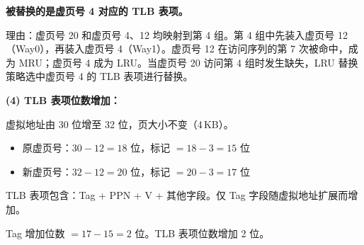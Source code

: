 \documentclass[12pt,a4paper]{ctexart}
\begin{document}
\begin{enumerate}[leftmargin=*,resume]
\textbf{被替换的是虚页号 4 对应的 TLB 表项。}

理由：虚页号 20 和虚页号 4、12 均映射到第 4 组。第 4 组中先装入虚页号 12（Way0），再装入虚页号 4（Way1）。虚页号 12 在访问序列的第 7 次被命中，成为 MRU；虚页号 4 成为 LRU。当虚页号 20 访问第 4 组时发生缺失，LRU 替换策略选中虚页号 4 的 TLB 表项进行替换。

\textbf{(4) TLB 表项位数增加：}

虚拟地址由 30 位增至 32 位，页大小不变（4\,KB）。
\begin{itemize}
\item 原虚页号：$30 - 12 = 18$ 位，标记 $= 18 - 3 = 15$ 位
\item 新虚页号：$32 - 12 = 20$ 位，标记 $= 20 - 3 = 17$ 位
\end{itemize}

TLB 表项包含：Tag + PPN + V + 其他字段。仅 Tag 字段随虚拟地址扩展而增加。

Tag 增加位数 $= 17 - 15 = 2$ 位。TLB 表项位数增加 2 位。

\end{enumerate}
\end{document}
